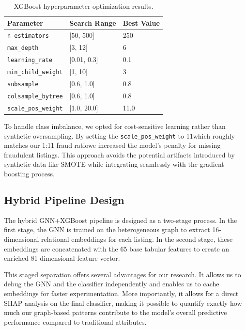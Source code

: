 \begin{table}[h]
\centering
\caption{XGBoost hyperparameter optimization results.}
\label{tab:3_8_xgb_params}
\begin{tabular}{lll}
\hline
Parameter & Search Range & Best Value \\
\hline
\texttt{n\_estimators} & [50, 500] & 250 \\
\texttt{max\_depth} & [3, 12] & 6 \\
\texttt{learning\_rate} & [0.01, 0.3] & 0.1 \\
\texttt{min\_child\_weight} & [1, 10] & 3 \\
\texttt{subsample} & [0.6, 1.0] & 0.8 \\
\texttt{colsample\_bytree} & [0.6, 1.0] & 0.8 \\
\texttt{scale\_pos\_weight} & [1.0, 20.0] & 11.0 \\
\hline
\end{tabular}
\end{table}

To handle class imbalance, we opted for cost-sensitive learning rather than synthetic oversampling. By setting the \texttt{scale\_pos\_weight} to 11which roughly matches our 1:11 fraud ratiowe increased the model's penalty for missing fraudulent listings. This approach avoids the potential artifacts introduced by synthetic data like SMOTE while integrating seamlessly with the gradient boosting process.

\subsection{Hybrid Pipeline Design}

The hybrid GNN+XGBoost pipeline is designed as a two-stage process. In the first stage, the GNN is trained on the heterogeneous graph to extract 16-dimensional relational embeddings for each listing. In the second stage, these embeddings are concatenated with the 65 base tabular features to create an enriched 81-dimensional feature vector.

This staged separation offers several advantages for our research. It allows us to debug the GNN and the classifier independently and enables us to cache embeddings for faster experimentation. More importantly, it allows for a direct SHAP analysis on the final classifier, making it possible to quantify exactly how much our graph-based patterns contribute to the model's overall predictive performance compared to traditional attributes.

